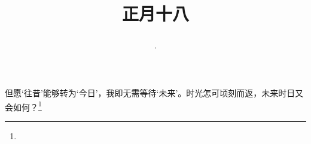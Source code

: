 \title{\date[d=27,m=2,y=2024][year:cn-y,年,month:cn,day:cn,日,·,weekday]·正月十八 }
但愿‘往昔’能够转为‘今日’，我即无需等待‘未来’。时光怎可顷刻而返，未来时日又会如何？\footnote{ }

